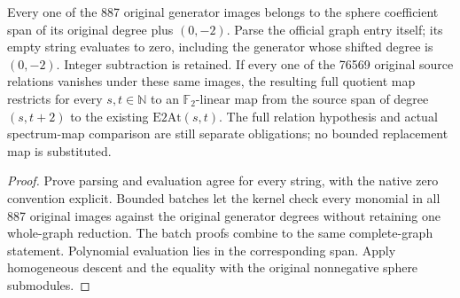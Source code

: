 \begin{proposition}
  \label{prop:lin-native-ceta-map-grading}
  \leanok
  Every one of the 887 original generator images belongs to the sphere
  coefficient span of its original degree plus $(0,-2)$. Parse the official
  graph entry itself; its empty string evaluates to zero, including the
  generator whose shifted degree is $(0,-2)$. Integer subtraction is retained.
  If every one of the 76569 original source relations vanishes under these
  same images, the resulting full quotient map restricts for every
  $s,t\in\mathbb N$ to an $\mathbb F_2$-linear map from the source span
  of degree $(s,t+2)$ to the existing $\mathrm{E2At}(s,t)$.
  The full relation hypothesis and actual spectrum-map comparison are still
  separate obligations; no bounded replacement map is substituted.
\end{proposition}
\begin{proof}
  \leanok
  Prove parsing and evaluation agree for every string, with the native zero
  convention explicit. Bounded batches let the kernel check every monomial
  in all 887 original images against the original generator degrees without
  retaining one whole-graph reduction. The batch proofs combine to the same
  complete-graph statement. Polynomial evaluation lies
  in the corresponding span. Apply homogeneous descent and the equality
  with the original nonnegative sphere submodules.
\end{proof}

